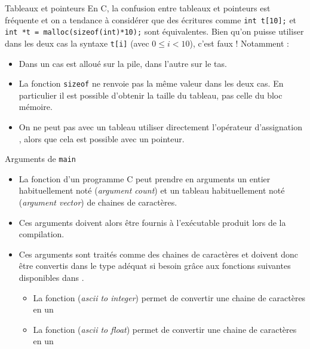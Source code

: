 \documentclass[10pt]{beamer}
\begin{document}
\begin{frame}[fragile]{\Ctitle}{\stitle}
	\begin{block}{Tableaux et pointeurs}
		\textcolor{BrickRed}{\small \danger \;} En C, la confusion entre tableaux et pointeurs est fréquente et on a tendance à considérer que des écritures comme \texttt{int t[10];} et \texttt{int *t = malloc(sizeof(int)*10);} sont équivalentes. Bien qu'on puisse utiliser dans les deux cas la syntaxe \texttt{t[i]} (avec $0\leqslant i < 10$), c'est \textcolor{BrickRed}{faux} ! Notamment   :
		\begin{itemize}
			\item<2-> Dans un cas  est alloué sur la pile, dans l'autre sur le tas.
			\item<3-> La fonction \texttt{sizeof} ne renvoie pas la même valeur dans les deux cas. En particulier il est possible d'obtenir la taille du tableau, pas celle du bloc mémoire.
			\item<4-> On ne peut pas avec un tableau utiliser directement l'opérateur d'assignation \kw{=}, alors que cela est possible avec un pointeur. 
		\end{itemize}
	\end{block}
\end{frame}

\begin{frame}{\Ctitle}{\stitle}
	\begin{block}{Arguments de {\tt main}}
		\begin{itemize}
			\item<1-> La fonction  d'un programme C peut prendre en arguments un entier habituellement noté  (\textit{argument count}) et un tableau habituellement noté  (\textit{argument vector}) de chaines de caractères.
			\item<2-> Ces arguments doivent alors être fournis à l'exécutable produit lors de la compilation.
			\item<3-> Ces arguments sont traités comme des chaines de caractères et doivent donc être convertis dans le type adéquat si besoin grâce aux fonctions suivantes disponibles dans .
				\begin{itemize}
					\item<4-> La fonction  (\textit{{\sc ascii} to integer}) permet de convertir une chaine de caractères en un 
					\item<5-> La fonction  (\textit{{\sc ascii} to float}) permet de convertir une chaine de caractères en un 
				\end{itemize}

		\end{itemize}
	\end{block}
\end{frame}
\end{document}
